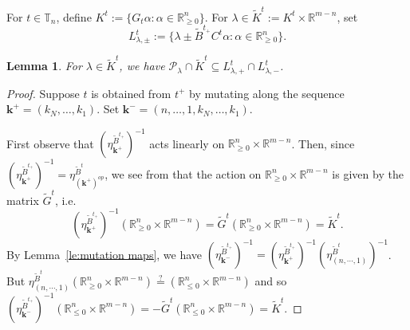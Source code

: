 \documentclass{amsart}
\newtheorem{lemma}[theorem]{Lemma}
\numberwithin{theorem}{section}
\newcommand{\bfk}{{\boldsymbol{k}}}
\newcommand{\cP}{\mathcal{P}}
\newcommand{\RR}{\mathbb{R}}
\newcommand{\TT}{\mathbb{T}}
\begin{document}
  For $t\in\TT_n$, define $K^t:=\{G_t\alpha:\alpha\in\RR_{\ge0}^n\}$.
  For $\lambda \in \widetilde K^t := K^t \times \RR^{m-n}$, set 
  \[L^t_{\lambda,\pm}:=\{\lambda \pm \widetilde B^{t_+} C^t\alpha:\alpha\in\RR_{\ge0}^n\}.\]
  \begin{lemma}
    For $\lambda\in \widetilde K^t$, we have $\cP_\lambda\cap \widetilde K^t\subseteq L^t_{\lambda,+}\cap L^t_{\lambda,-}$.
  \end{lemma}
  \begin{proof}
    Suppose $t$ is obtained from $t^+$ by mutating along the sequence $\bfk^+=(k_N,\ldots,k_1)$.
    Set $\bfk^-=(n,\ldots,1,k_N,\ldots,k_1)$.

    First observe that $\left(\eta^{\widetilde B^{t_+}}_{\bfk^+}\right)^{-1}$ acts linearly on $\RR_{\ge0}^n\times \RR^{m-n}$.
    Then, since $\left(\eta^{\widetilde B^{t_+}}_{\bfk^+}\right)^{-1}=\eta^{\widetilde B^t}_{(\bfk^+)^{op}}$, we see from \cite[Equation (1.13)]{nakanishi-zelevinsky} that the action on $\RR_{\ge0}^n\times \RR^{m-n}$ is given by the matrix $\widetilde G^t$, i.e. 
    \[\left(\eta^{\widetilde B^{t_+}}_{\bfk^+}\right)^{-1}(\RR_{\ge0}^n\times \RR^{m-n})=\widetilde G^t(\RR_{\ge0}^n\times \RR^{m-n})=\widetilde K^t.\]
    By Lemma~\ref{le:mutation maps}, we have $\left(\eta^{\widetilde B^{t_+}}_{\bfk^-}\right)^{-1}=\left(\eta^{\widetilde B^{t_+}}_{\bfk^+}\right)^{-1}\left(\eta^{\widetilde B^t}_{(n,\cdots,1)}\right)^{-1}$.
    But $\eta^{\widetilde B^t}_{(n,\cdots,1)}(\RR_{\ge0}^n\times \RR^{m-n})\stackrel{?}{=}(\RR_{\le0}^n\times \RR^{m-n})$ and so $\left(\eta^{\widetilde B^{t_+}}_{\bfk^-}\right)^{-1}(\RR_{\le0}^n\times \RR^{m-n})=-\widetilde G^t(\RR_{\le0}^n\times \RR^{m-n})=\widetilde K^t$.


\end{proof}
\end{document}
